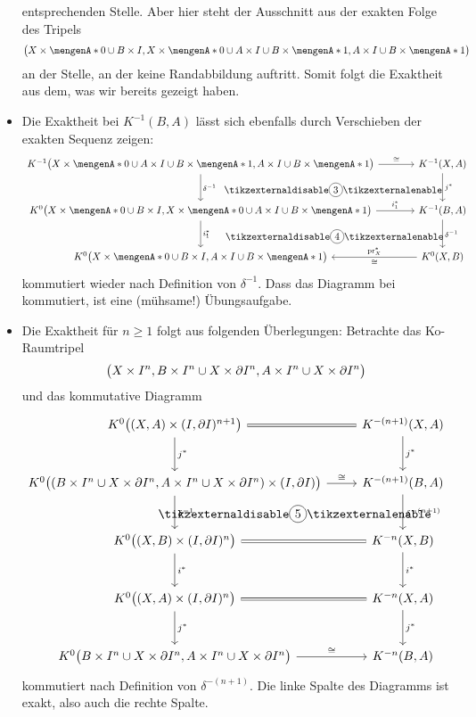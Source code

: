 \begin{beweis}
\begin{itemize}
	entsprechenden Stelle. Aber hier steht der Ausschnitt aus der exakten Folge des Tripels 
	\[
		\enbrace[\big]{X \times \set{0} \cup B \times I, X \times \set{0} \cup A \times I \cup B \times \set{1}, A \times I \cup B \times \set{1}} 
	\]
	an der Stelle, an der keine Randabbildung auftritt. Somit folgt die Exaktheit aus dem, was wir bereits gezeigt haben.
	\item Die Exaktheit bei $K ^{-1}(B,A)$ lässt sich ebenfalls durch Verschieben der exakten Sequenz zeigen:
	\[
		\begin{tikzcd}[column sep=large,row sep=large]
			K^{-1} \enbrace[\big]{X \times \set{0} \cup A \times I \cup B \times \set{1}, A \times I \cup B \times \set{1}} \rar["\cong"] \dar["\delta^{-1}"] 
			\drar[phantom,"\circled{\text{3}}"]
			&  K ^{-1}(X,A) \dar["j^*"] \\
			K^0 \enbrace[\big]{X \times \set{0} \cup B \times I, X \times \set{0} \cup A \times I \cup B \times \set{1}} \rar["i_1^*"] \dar["i_1^*"] 
			\drar[phantom,"\circled{\text{4}}"]
			& K ^{-1}(B,A) \dar["\delta^{-1}"]\\
			K^0 \enbrace[\big]{X \times \set{0} \cup B \times I, A \times I \cup B \times \set{1}} & K^0 (X,B) \lar["\cong","\pr_X^*"']  
		\end{tikzcd}
	\]
	 kommutiert wieder nach Definition von $\delta ^{-1}$. Dass das Diagramm bei  kommutiert, ist eine (mühsame!) Übungsaufgabe.
	\item Die Exaktheit für $n\ge 1$ folgt aus folgenden Überlegungen: Betrachte das Ko-Raumtripel
	\[
		\enbrace[\big]{X \times I^n, B \times I^n \cup X \times \partial I^n, A \times I^n \cup X \times \partial I^n} 
	\]
	und das kommutative Diagramm
	\[
		\begin{tikzcd}[row sep=large]
			K^0 \enbrace[\big]{(X,A) \times (I,\partial I)^{n+1}} \rar[equal] \dar["j^*"] & K^{-(n+1)}(X,A) \dar["j^*"] \\
			K^0 \enbrace[\big]{ \enbrace*{B \times I^n \cup X \times \partial I^n, A \times I^n \cup X \times \partial I^n} \times (I,\partial I)} 
			\dar["\delta^{-1}"] \rar["\cong"] \drar[phantom,"\circled{\text{5}}"] & K^{-(n+1)}(B,A) \dar["\delta^{-(n+1)}"] \\
			K^0 \enbrace[\big]{(X,B) \times (I,\partial I)^n} \rar[equal] \dar["i^*"] & K^{-n}(X,B) \dar["i^*"]\\
			K^0 \enbrace[\big]{ (X,A) \times (I,\partial I)^n} \rar[equal] \dar["j^*"] & K^{-n}(X,A) \dar["j^*"] \\
			K^0 \enbrace[\big]{B \times I^n \cup X \times \partial I^n, A \times I^n \cup X \times \partial I^n} \rar["\cong"] & K^{-n}(B,A)
		\end{tikzcd}
	\]
	 kommutiert nach Definition von $\delta^{-(n+1)}$. Die linke Spalte des Diagramms ist exakt, also auch die rechte Spalte. \qedhere
\end{itemize}
\end{beweis}
\newpage

